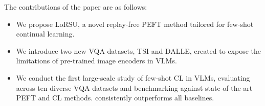 The contributions of the paper are as follows:
\begin{itemize}[noitemsep,topsep=1pt,parsep=1pt,partopsep=1pt]
    \item We propose LoRSU, a novel replay-free PEFT method tailored for few-shot continual learning.
    \item We introduce two new VQA datasets, TSI and DALLE, created to expose the limitations of pre-trained image encoders in VLMs.
    \item We conduct the first large-scale study of few-shot CL in VLMs, evaluating \ours across ten diverse VQA datasets and benchmarking against state-of-the-art PEFT and CL methods. \ours consistently outperforms all baselines.
\end{itemize}


